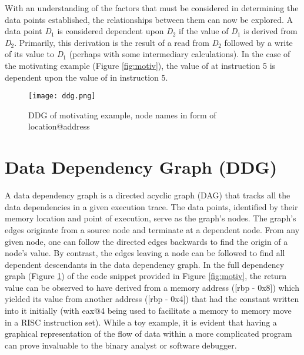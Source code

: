 With an understanding of the factors that must be considered in determining the data points established, the relationships between them can now be explored. A data point \emph{D$_1$} is considered dependent upon \emph{D$_2$} if the value of \emph{D$_1$} is derived from \emph{D$_2$}. Primarily, this derivation is the result of a read from  \emph{D$_2$} followed by a write of its value to \emph{D$_1$} (perhaps with some intermediary calculations). In the case of the motivating example (Figure \ref{fig:motiv}), the value of \code{[rbp - 0x8]} at instruction 5 is dependent upon the value of  in instruction 5.

\begin{figure}
    \centering
    \texttt{[image: ddg.png]}
    \caption{DDG of motivating example, node names in form of location@address}
    \label{fig:motivddg}
\end{figure}

\section{Data Dependency Graph (DDG)}
A data dependency graph is a directed acyclic graph (DAG) that tracks all the data dependencies in a given execution trace. The data points, identified by their memory location and point of execution, serve as the graph’s nodes. The graph's edges originate from a source node and terminate at a dependent node. From any given node, one can follow the directed edges backwards to find the origin of a node’s value. By contrast, the edges leaving a node can be followed to find all dependent descendants in the data dependency graph. In the full dependency graph (Figure \ref{fig:motivddg}) of the code snippet provided in Figure \ref{fig:motiv}, the return value can be observed to have derived from a memory address ([rbp - 0x8]) which yielded its value from another address ([rbp - 0x4]) that had the constant written into it initially (with eax@4 being used to facilitate a memory to memory move in a RISC instruction set). While a toy example, it is evident that having a graphical representation of the flow of data within a more complicated program can prove invaluable to the binary analyst or software debugger.
